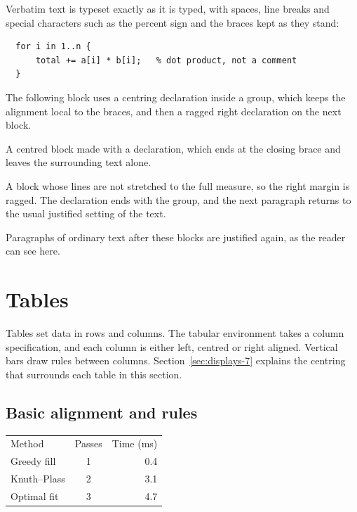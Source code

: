 \documentclass{article}
\begin{document}
Verbatim text is typeset exactly as it is typed, with spaces, line breaks and special
characters such as the percent sign and the braces kept as they stand:

\begin{verbatim}
  for i in 1..n {
      total += a[i] * b[i];   % dot product, not a comment
  }
\end{verbatim}

The following block uses a centring declaration inside a group, which keeps the
alignment local to the braces, and then a ragged right declaration on the next block.

{\centering A centred block made with a declaration, which ends at the closing
brace and leaves the surrounding text alone.\par}

{\raggedright A block whose lines are not stretched to the full measure, so the
right margin is ragged. The declaration ends with the group, and the next paragraph
returns to the usual justified setting of the text.\par}

Paragraphs of ordinary text after these blocks are justified again, as the reader can
see here.

\section{Tables}\label{sec:tables-7}

Tables set data in rows and columns. The tabular environment takes a column
specification, and each column is either left, centred or right aligned. Vertical bars
draw rules between columns. Section~\ref{sec:displays-7} explains the centring that surrounds each table in
this section.

\subsection{Basic alignment and rules}\label{sec:tables-basic-7}

\begin{center}
\begin{tabular}{l c r}
Method & Passes & Time (ms) \\
Greedy fill      & 1 & 0.4 \\
Knuth--Plass     & 2 & 3.1 \\
Optimal fit      & 3 & 4.7 \\
\end{tabular}
\end{center}
\end{document}
